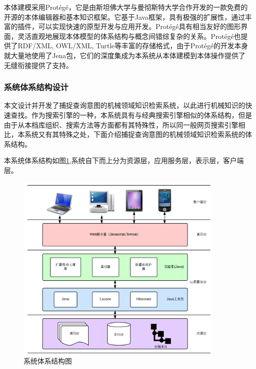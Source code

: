 \documentclass[12pt,a4paper]{article}
\newcommand{\wuhao}{\fontsize{10.5pt}{\baselineskip}\selectfont}
\begin{document}
	本体建模采用{\Times Prot{\'e}g{\'e}}，它是由斯坦佛大学与曼彻斯特大学合作开发的一款免费的开源的本体编辑器和基本知识框架。它基于{\Times Java}框架，具有极强的扩展性，通过丰富的插件，可以实现快速的原型开发与应用开发。{\Times Prot{\'e}g{\'e}}具有相当友好的图形界面，灵活直观地展现本体模型的体系结构与概念间错综复杂的关系。{\Times Prot{\'e}g{\'e}}也提供了{\Times RDF/XML, OWL/XML, Turtle}等丰富的存储格式，由于{\Times Prot{\'e}g{\'e}}的开发本身就大量地使用了{\Times Jena}包，它们的深度集成为本系统从本体建模到本体操作提供了无缝衔接提供了支持。

		\subsubsection{系统体系结构设计}
	本文设计并开发了捕捉查询意图的机械领域知识检索系统，以此进行机械知识的快速查找。作为搜索引擎的一种，本系统具有与经典搜索引擎相似的体系结构，但是由于从本档库组织、搜索方法等方面都有其特殊性，所以同一般网页搜索引擎相比，本系统又有其特殊之处，下面介绍捕捉查询意图的机械领域知识检索系统的体系结构。
	
	本系统体系结构如图\ref{fig:体系结构},系统自下而上分为资源层，应用服务层，表示层，客户端层。
	
	\begin{figure}[htbp] 
	\centering\includegraphics[width=4in]{fig/SystemStructure.png} 
	\caption{\wuhao 系统体系结构图}\label{fig:体系结构} 
	\end{figure} 
	
\end{document}
